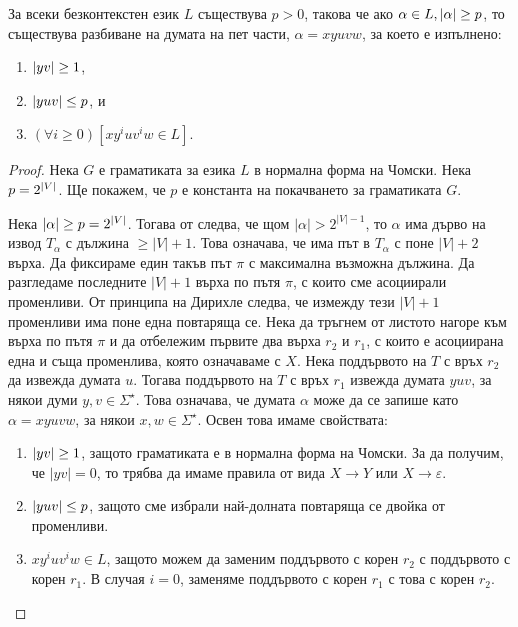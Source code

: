 \begin{lemma}
  \label{lem:pumping-context} 
  За всеки безконтекстен език $L$ съществува $p>0$, такова
  че ако $\alpha\in L, \lvert{\alpha}\rvert \geq p$, то съществува разбиване на думата на пет части, $\alpha=xyuvw$,
  за което е изпълнено:
  \begin{enumerate}[1)]
  \item
    $\lvert{yv}\rvert\geq 1$,
  \item
    $\lvert{yuv}\rvert\leq p$, и
  \item
    $(\forall i\geq 0)[xy^iuv^iw\in L]$.
\end{enumerate}
\end{lemma}
\begin{proof}
  Нека $G$ е граматиката за езика $L$ в нормална форма на Чомски.
  Нека $p = 2^{\lvert{V}\rvert}$. Ще покажем, че $p$ е константа на покачването за граматиката $G$.
  
  Нека $\lvert{\alpha}\rvert \geq p = 2^{\lvert{V}\rvert}$. 
  Тогава от  следва, че щом $|\alpha| > 2^{|V| - 1}$, то $\alpha$
  има дърво на извод $T_\alpha$ с дължина $\geq |V|+1$. Това означава, че има път в $T_\alpha$
  с поне $|V|+2$ върха.
  Да фиксираме един такъв път $\pi$ с максимална възможна дължина.
  Да разгледаме последните $|V|+1$ върха по пътя $\pi$, с които сме асоциирали променливи.
  От принципа на Дирихле следва, че измежду тези $|V|+1$ променливи има поне една повтаряща се.
  Нека да тръгнем от листото нагоре към върха по пътя $\pi$ и да отбележим първите два върха $r_2$ и $r_1$,
  с които е асоциирана една и съща променлива, която означаваме с $X$.
  Нека поддървото на $T$ с връх $r_2$ да извежда думата $u$.
  Тогава поддървото на $T$ с връх $r_1$ извежда думата $yuv$, за някои думи $y,v \in \Sigma^\star$.
  Това означава, че думата $\alpha$ може да се запише като $\alpha = xyuvw$, за някои $x, w \in \Sigma^\star$.
  Освен това имаме свойствата:
  \begin{enumerate}[1)]
  \item
    $\lvert{yv}\rvert\geq 1$,
    защото граматиката е в нормална форма на Чомски.
    За да получим, че $|yv| = 0$, то трябва да имаме правила от вида $X \to Y$ или $X \to \varepsilon$.
  \item
    $\lvert{yuv}\rvert \leq p$, защото сме избрали най-долната повтаряща се двойка от променливи.
  \item
    $xy^iuv^iw \in L$, защото можем да заменим поддървото 
    с корен $r_2$ с поддървото с корен $r_1$.
    В случая $i = 0$, заменяме поддървото с корен $r_1$ с това с корен $r_2$.
  \end{enumerate}
\end{proof}

